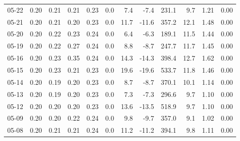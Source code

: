 \begin{threeparttable}
{\begin{tabular}{lrrrrrrrrrrr}
  05-22 &          0.20 &          0.21 &          0.21 &        0.23 &                 0.0 &                 7.4 &       -7.4 &               231.1 &              9.7 &            1.21 &                   0.00 \\
  05-21 &          0.20 &          0.21 &          0.20 &        0.23 &                 0.0 &                11.7 &      -11.6 &               357.2 &             12.1 &            1.48 &                   0.00 \\
  05-20 &          0.20 &          0.22 &          0.23 &        0.24 &                 0.0 &                 6.4 &       -6.3 &               189.1 &             11.5 &            1.44 &                   0.00 \\
  05-19 &          0.20 &          0.22 &          0.27 &        0.24 &                 0.0 &                 8.8 &       -8.7 &               247.7 &             11.7 &            1.45 &                   0.00 \\
  05-16 &          0.20 &          0.23 &          0.35 &        0.24 &                 0.0 &                14.3 &      -14.3 &               398.4 &             12.7 &            1.62 &                   0.00 \\
  05-15 &          0.20 &          0.23 &          0.21 &        0.23 &                 0.0 &                19.6 &      -19.6 &               533.7 &             11.8 &            1.46 &                   0.00 \\
  05-14 &          0.20 &          0.19 &          0.20 &        0.23 &                 0.0 &                 8.7 &       -8.7 &               370.1 &             10.1 &            1.14 &                   0.00 \\
  05-13 &          0.20 &          0.19 &          0.20 &        0.23 &                 0.0 &                 7.3 &       -7.3 &               296.6 &              9.7 &            1.10 &                   0.00 \\
  05-12 &          0.20 &          0.20 &          0.20 &        0.23 &                 0.0 &                13.6 &      -13.5 &               518.9 &              9.7 &            1.10 &                   0.00 \\
  05-09 &          0.20 &          0.20 &          0.22 &        0.24 &                 0.0 &                 9.8 &       -9.7 &               357.0 &              9.1 &            1.02 &                   0.00 \\
  05-08 &          0.20 &          0.21 &          0.21 &        0.24 &                 0.0 &                11.2 &      -11.2 &               394.1 &              9.8 &            1.11 &                   0.00 \\

\end{tabular}}
\end{threeparttable}
